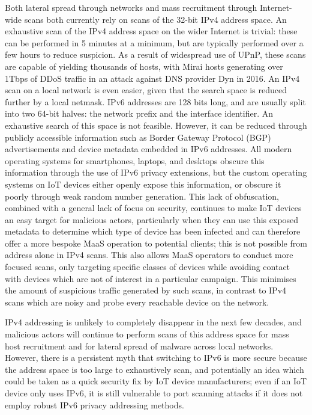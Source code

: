 \documentclass[10pt,sigconf]{acmart}
\begin{document}
Both lateral spread through networks and mass recruitment through Internet-wide scans both currently rely on scans of the 32-bit IPv4 address space.
An exhaustive scan of the IPv4 address space on the wider Internet is trivial:
these can be performed in 5 minutes at a minimum, but are typically performed over a few hours to reduce suspicion.
As a result of widespread use of UPnP, these scans are capable of yielding thousands of hosts, with Mirai hosts generating over 1Tbps of DDoS traffic in an attack against DNS provider Dyn in 2016.
An IPv4 scan on a local network is even easier, given that the search space is reduced further by a local netmask.
IPv6 addresses are 128 bits long, and are usually split into two 64-bit halves: the network prefix and the interface identifier.
An exhaustive search of this space is not feasible.
However, it can be reduced through publicly accessible information such as Border Gateway Protocol (BGP) advertisements and device metadata embedded in IPv6 addresses.
All modern operating systems for smartphones, laptops, and desktops obscure this information through the use of IPv6 privacy extensions, but the custom operating systems on IoT devices either openly expose this information, or obscure it poorly through weak random number generation.
This lack of obfuscation, combined with a general lack of focus on security, continues to make IoT devices an easy target for malicious actors, particularly when they can use this exposed metadata to determine which type of device has been infected and can therefore offer a more bespoke MaaS operation to potential clients;
this is not possible from address alone in IPv4 scans.
This also allows MaaS operators to conduct more focused scans, only targeting specific classes of devices while avoiding contact with devices which are not of interest in a particular campaign.
This minimises the amount of suspicious traffic generated by such scans, in contrast to IPv4 scans which are noisy and probe every reachable device on the network.

IPv4 addressing is unlikely to completely disappear in the next few decades, and malicious actors will continue to perform scans of this address space for mass host recruitment and for lateral spread of malware across local networks.
However, there is a persistent myth that switching to IPv6 is more secure because the address space is too large to exhaustively scan, and potentially an idea which could be taken as a quick security fix by IoT device manufacturers;
even if an IoT device only uses IPv6, it is still vulnerable to port scanning attacks if it does not employ robust IPv6 privacy addressing methods.
\end{document}
